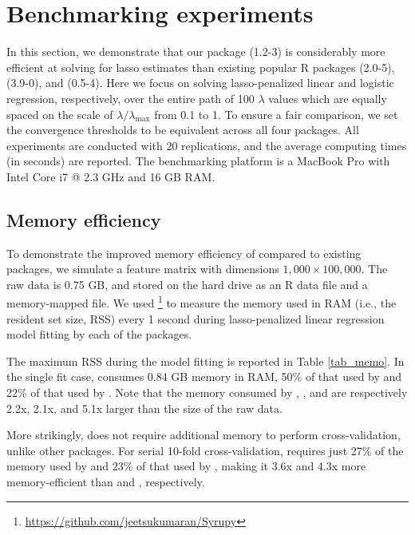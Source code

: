 \section{Benchmarking experiments}

In this section, we demonstrate that our package  (1.2-3) is considerably more efficient at solving for lasso estimates than existing popular R packages  (2.0-5),  (3.9-0), and  (0.5-4). Here we focus on solving lasso-penalized linear and logistic regression, respectively, over the entire path of 100 $\lambda$ values which are equally spaced on the scale of $\lambda / \lambda_{\max}$ from 0.1 to 1.  To ensure a fair comparison, we set the convergence thresholds to be equivalent across all four packages.  All experiments are conducted with 20 replications, and the average computing times (in seconds) are reported. The benchmarking platform is a MacBook Pro with Intel Core i7 @ 2.3 GHz and 16 GB RAM. 

\subsection{Memory efficiency}

To demonstrate the improved memory efficiency of  compared to existing packages, we simulate a feature matrix with dimensions $1,000 \times 100,000$. The raw data is 0.75 GB, and stored on the hard drive as an R data file and a memory-mapped file. We used \footnote{\url{https://github.com/jeetsukumaran/Syrupy}} to measure the memory used in RAM (i.e., the resident set size, RSS) every 1 second during lasso-penalized linear regression model fitting by each of the packages. 

The maximum RSS during the model fitting is reported in Table \ref{tab_memo}. In the single fit case,  consumes 0.84 GB memory in RAM, 50\% of that used by  and  22\% of that used by . Note that the memory consumed by , , and  are respectively 2.2x,  2.1x, and 5.1x larger than the size of the raw data.

More strikingly,  does not require additional memory to perform cross-validation, unlike other packages.  For serial 10-fold cross-validation,   requires just 27\% of the memory used by  and 23\% of that used by , making it 3.6x and 4.3x more memory-efficient than  and , respectively.

